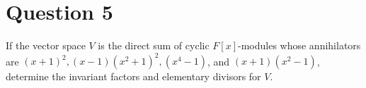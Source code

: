 \section{Question 5}

\begin{question}
    If the vector space $V$ is the direct sum of cyclic $F[x]$-modules whose annihilators are $(x+1)^2,(x-1)\left(x^2+1\right)^2,\left(x^4-1\right)$, and $(x+1)\left(x^2-1\right)$, determine the invariant factors and elementary divisors for $V$.
\end{question}

\begin{answer}
    
\end{answer}